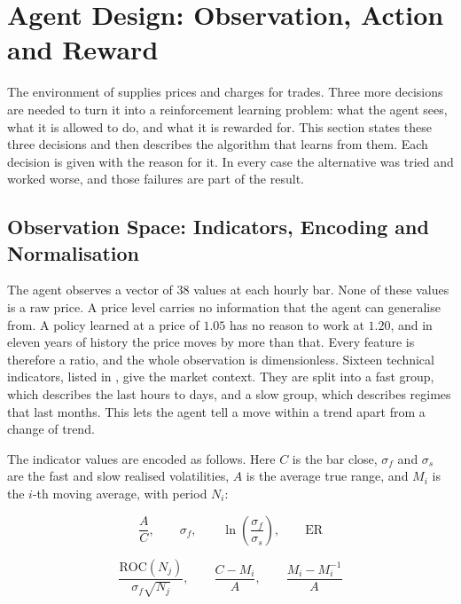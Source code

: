 \section{Agent Design: Observation, Action and Reward}
\label{Section:AgentDesign}

The environment of  supplies prices and charges for trades. Three more decisions are needed to turn it into a reinforcement learning problem: what the agent sees, what it is allowed to do, and what it is rewarded for. This section states these three decisions and then describes the algorithm that learns from them. Each decision is given with the reason for it. In every case the alternative was tried and worked worse, and those failures are part of the result.

\subsection{Observation Space: Indicators, Encoding and Normalisation}

The agent observes a vector of $38$ values at each hourly bar. None of these values is a raw price. A price level carries no information that the agent can generalise from. A policy learned at a price of $1.05$ has no reason to work at $1.20$, and in eleven years of history the price moves by more than that. Every feature is therefore a ratio, and the whole observation is dimensionless. Sixteen technical indicators, listed in , give the market context. They are split into a fast group, which describes the last hours to days, and a slow group, which describes regimes that last months. This lets the agent tell a move within a trend apart from a change of trend.



The indicator values are encoded as follows. Here $C$ is the bar close, $\sigma_f$ and $\sigma_s$ are the fast and slow realised volatilities, $A$ is the average true range, and $M_i$ is the $i$-th moving average, with period $N_i$:

\begin{equation}
\frac{A}{C}, \qquad \sigma_f, \qquad \ln\!\left(\frac{\sigma_f}{\sigma_s}\right), \qquad \text{ER}
\label{Equation:VolatilityFeatures}
\end{equation}

\begin{equation}
\frac{\text{ROC}(N_j)}{\sigma_f \sqrt{N_j}}, \qquad \frac{C - M_i}{A}, \qquad \frac{M_i - M_i^{-1}}{A}
\label{Equation:TrendFeatures}
\end{equation}

